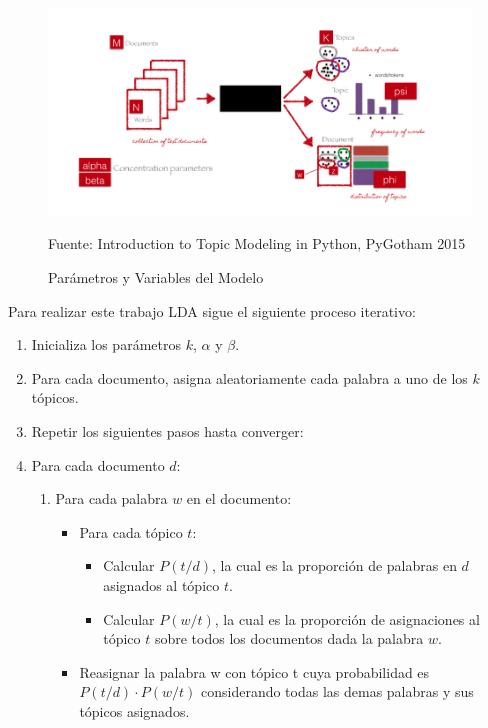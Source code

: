 \begin{itemize}
    \begin{figure}[h]
        \centering
        \includegraphics[width=1\textwidth]{figures/LDA.png}
        \caption{\label{fig:LDA_Model} Parámetros y Variables del Modelo} Fuente: Introduction to Topic Modeling in Python, PyGotham 2015 \cite{LDA_Model}
    \end{figure}
    
    Para realizar este trabajo LDA sigue el siguiente proceso iterativo:
    
    \begin{enumerate}
        \item Inicializa los parámetros $k$, $\alpha$ y $\beta$.
        \item Para cada documento, asigna aleatoriamente cada palabra a uno de los $k$ tópicos.
        \item Repetir los siguientes pasos hasta converger:
        \item Para cada documento $d$:
        \begin{enumerate}
            \item Para cada palabra $w$ en el documento:
            \begin{itemize}
                \item Para cada tópico $t$:
                \begin{itemize}
                    \item Calcular $P(t/d)$, la cual es la proporción de palabras en $d$ asignados al tópico $t$.
                    \item Calcular $P(w/t)$, la cual es la proporción de asignaciones al tópico $t$ sobre todos los documentos dada la palabra $w$.
                \end{itemize}
            \item Reasignar la palabra w con tópico t cuya probabilidad es $P(t/d) \cdot P(w/t)$ considerando todas las demas palabras y sus tópicos asignados.
            \end{itemize}
        \end{enumerate}
    \end{enumerate}
    

\end{itemize}
